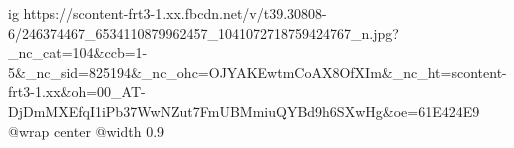  
 
 
 
 

\ifcmt
  ig https://scontent-frt3-1.xx.fbcdn.net/v/t39.30808-6/246374467_6534110879962457_1041072718759424767_n.jpg?_nc_cat=104&ccb=1-5&_nc_sid=825194&_nc_ohc=OJYAKEwtmCoAX8OfXIm&_nc_ht=scontent-frt3-1.xx&oh=00_AT-DjDmMXEfqI1iPb37WwNZut7FmUBMmiuQYBd9h6SXwHg&oe=61E424E9
	@wrap center
	@width 0.9
\fi
